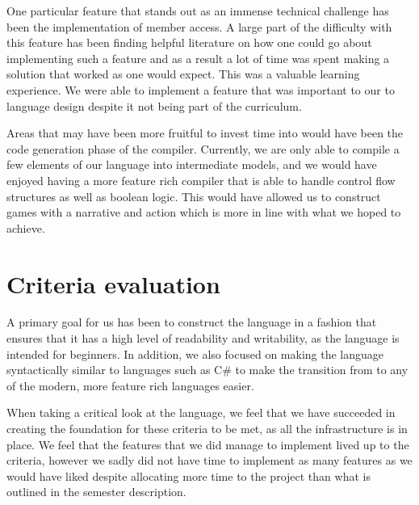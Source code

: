 One particular feature that stands out as an immense technical challenge has been the implementation of member access. A large part of the difficulty with this feature has been finding helpful literature on how one could go about implementing such a feature and as a result a lot of time was spent making a solution that worked as one would expect. This was a valuable learning experience. We were able to implement a feature that was important to our to language design despite it not being part of the curriculum.

Areas that may have been more fruitful to invest time into would have been the code generation phase of the compiler. Currently, we are only able to compile a few elements of our language into intermediate models, and we would have enjoyed having a more feature rich compiler that is able to handle control flow structures as well as boolean logic. This would have allowed us to construct games with a narrative and action which is more in line with what we hoped to achieve.

\section{Criteria evaluation}
A primary goal for us has been to construct the language in a fashion that ensures that it has a high level of readability and writability, as the language is intended for beginners. In addition, we also focused on making the language syntactically similar to languages such as C\# to make the transition from \dazel{} to any of the modern, more feature rich languages easier. 

When taking a critical look at the language, we feel that we have succeeded in creating the foundation for these criteria to be met, as all the infrastructure is in place. 
We feel that the features that we did manage to implement lived up to the criteria, however we sadly did not have time to implement as many features as we would have liked despite allocating more time to the project than what is outlined in the semester description.

